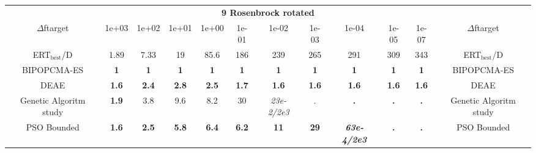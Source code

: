 \begin{tabular}{cccccccccccc}
 & \multicolumn{10}{c}{{\normalsize \textbf{9 Rosenbrock rotated}}}\\
$\Delta$ftarget& 1e+03& 1e+02& 1e+01& 1e+00& 1e-01& 1e-02& 1e-03& 1e-04& 1e-05& 1e-07 & $\Delta$ftarget \\
ERT$_{\textrm{best}}$/D& 1.89& 7.33& 19& 85.6& 186& 239& 265& 291& 309& 343 & ERT$_{\textrm{best}}$/D \\
\hline
BIPOPCMA-ES & \textbf{1} & \textbf{1} & \textbf{1} & \textbf{1} & \textbf{1} & \textbf{1} & \textbf{1} & \textbf{1} & \textbf{1} & \textbf{1} & BIPOPCMA-ES \cite{add_an_entry_for_BIPOPCMA-ES_in_bbob.bib}\\
DEAE & \textbf{1.6} & \textbf{2.4} & \textbf{2.8} & \textbf{2.5} & \textbf{1.7} & \textbf{1.6} & \textbf{1.6} & \textbf{1.6} & \textbf{1.6} & \textbf{1.6} & DEAE \cite{add_an_entry_for_DEAE_in_bbob.bib}\\
Genetic Algoritm study & \textbf{1.9} & 3.8 & 9.6 & 8.2 & 30 & \textit{23e-2}\textit{/2e3} & . & \textbf{.} & \textbf{.} & \textbf{.} & Genetic Algoritm study \cite{add_an_entry_for_Genetic Algoritm study_in_bbob.bib}\\
PSO Bounded & \textbf{1.6} & \textbf{2.5} & \textbf{5.8} & \textbf{6.4} & \textbf{6.2} & \textbf{11} & \textbf{29} & \textbf{\textit{63e-4}\textit{/2e3}} & \textbf{.} & \textbf{.} & PSO Bounded \cite{add_an_entry_for_PSO Bounded_in_bbob.bib}
\end{tabular}
